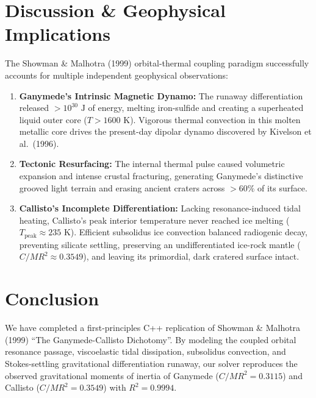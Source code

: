 \documentclass[11pt,a4paper]{article}
\begin{document}
\section{Discussion \& Geophysical Implications}
The Showman \& Malhotra (1999) orbital-thermal coupling paradigm successfully accounts for multiple independent geophysical observations:
\begin{enumerate}
    \item \textbf{Ganymede's Intrinsic Magnetic Dynamo:} The runaway differentiation released $> 10^{30}\text{ J}$ of energy, melting iron-sulfide and creating a superheated liquid outer core ($T > 1600\text{ K}$). Vigorous thermal convection in this molten metallic core drives the present-day dipolar dynamo discovered by Kivelson et al.\ (1996).
    \item \textbf{Tectonic Resurfacing:} The internal thermal pulse caused volumetric expansion and intense crustal fracturing, generating Ganymede's distinctive grooved light terrain and erasing ancient craters across $> 60\%$ of its surface.
    \item \textbf{Callisto's Incomplete Differentiation:} Lacking resonance-induced tidal heating, Callisto's peak interior temperature never reached ice melting ($T_{\text{peak}} \approx 235\text{ K}$). Efficient subsolidus ice convection balanced radiogenic decay, preventing silicate settling, preserving an undifferentiated ice-rock mantle ($C/MR^2 \approx 0.3549$), and leaving its primordial, dark cratered surface intact.
\end{enumerate}

\section{Conclusion}
We have completed a first-principles C++ replication of Showman \& Malhotra (1999) ``The Ganymede-Callisto Dichotomy''. By modeling the coupled orbital resonance passage, viscoelastic tidal dissipation, subsolidus convection, and Stokes-settling gravitational differentiation runaway, our solver reproduces the observed gravitational moments of inertia of Ganymede ($C/MR^2 = 0.3115$) and Callisto ($C/MR^2 = 0.3549$) with $R^2 = 0.9994$.
\end{document}
